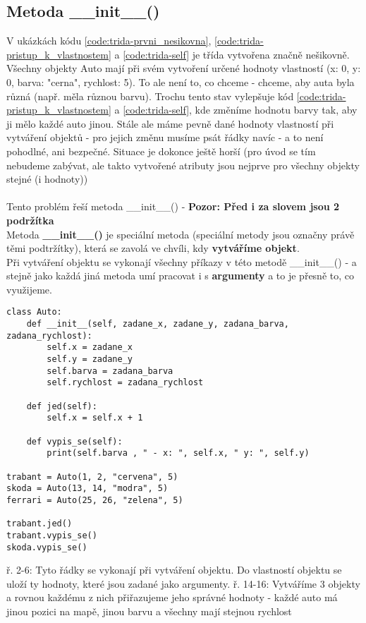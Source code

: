 \subsection{Metoda \_\_init\_\_()}
V ukázkách kódu \ref{code:trida-prvni_nesikovna}, \ref{code:trida-pristup_k_vlastnostem} a \ref{code:trida-self} je třída vytvořena značně nešikovně. Všechny objekty Auto mají při svém vytvoření určené hodnoty vlastností (x: 0, y: 0, barva: "cerna", rychlost: 5). To ale není to, co chceme - chceme, aby auta byla různá (např. měla různou barvu). Trochu tento stav vylepšuje kód \ref{code:trida-pristup_k_vlastnostem} a \ref{code:trida-self}, kde změníme hodnotu barvy tak, aby ji mělo každé auto jinou. Stále ale máme pevně dané hodnoty vlastností při vytváření objektů - pro jejich změnu musíme psát řádky navíc - a to není pohodlné, ani bezpečné. Situace je dokonce ještě horší (pro úvod se tím nebudeme zabývat, ale takto vytvořené atributy jsou nejprve pro všechny objekty stejné (i hodnoty))\\
\vspace{.5cm}\\
Tento problém řeší metoda \_\_init\_\_() - \textbf{Pozor: Před i za slovem  jsou 2 podržítka}\\
Metoda \textbf{\_\_init\_\_()} je speciální metoda (speciální metody jsou označny právě těmi podtržítky), která se zavolá ve chvíli, kdy \textbf{vytváříme objekt}.\\ Při vytváření objektu se vykonají všechny příkazy v této metodě \_\_init\_\_() - a stejně jako každá jiná metoda umí pracovat i s \textbf{argumenty} a to je přesně to, co využijeme.\\ 
\begin{minipage}[c]{.45\textwidth}
\begin{code}
\begin{verbatim}
class Auto:
	def __init__(self, zadane_x, zadane_y, zadana_barva, zadana_rychlost):
		self.x = zadane_x
		self.y = zadane_y
		self.barva = zadana_barva
		self.rychlost = zadana_rychlost
	
	def jed(self):
		self.x = self.x + 1
		
	def vypis_se(self):
		print(self.barva , " - x: ", self.x, " y: ", self.y)
		
trabant = Auto(1, 2, "cervena", 5)
skoda = Auto(13, 14, "modra", 5)
ferrari = Auto(25, 26, "zelena", 5)

trabant.jed()
trabant.vypis_se()
skoda.vypis_se()
\end{verbatim}
\label{code:trida-init}
\end{code}
\end{minipage}
\begin{minipage}[t]{.45\textwidth}
\vspace{.5cm}
ř. 2-6:		Tyto řádky se vykonají při vytváření objektu. Do vlastností objektu se uloží ty hodnoty, které jsou zadané jako argumenty.
ř. 14-16:	Vytváříme 3 objekty a rovnou každému z nich přiřazujeme jeho správné hodnoty - každé auto má jinou pozici na mapě, jinou barvu a všechny mají stejnou rychlost
\end{minipage}

